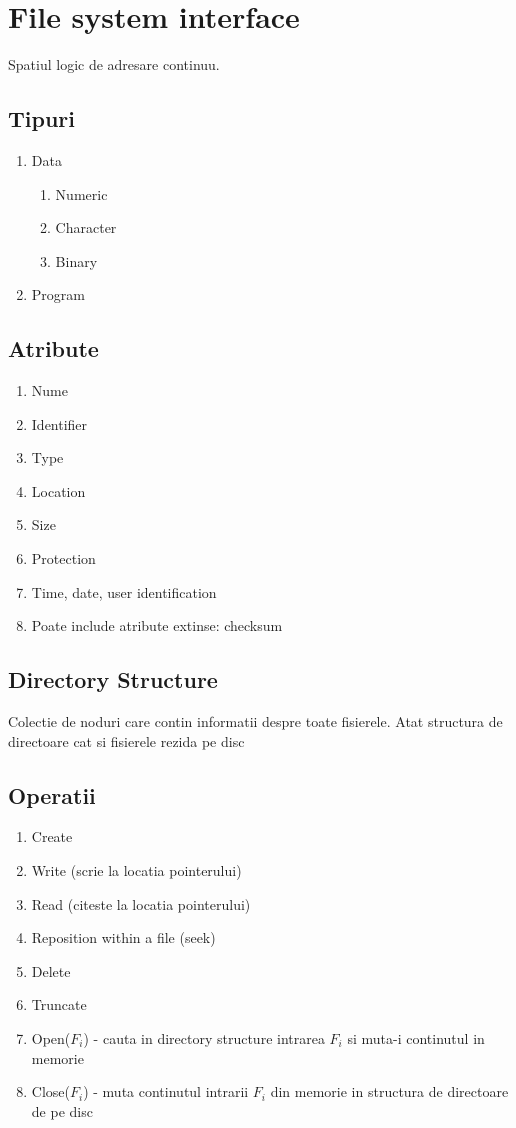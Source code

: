\documentclass{article}
\begin{document}
\section[Ch13 File system interface]{File system interface}
Spatiul logic de adresare continuu.
\subsection*{Tipuri}
\begin{enumerate}
    \item Data
          \begin{enumerate}
              \item Numeric
              \item Character
              \item Binary
          \end{enumerate}
    \item Program
\end{enumerate}

\subsection*{Atribute}
\begin{enumerate}
    \item Nume
    \item Identifier
    \item Type
    \item Location
    \item Size
    \item Protection
    \item Time, date, user identification
    \item Poate include atribute extinse: checksum
\end{enumerate}

\subsection*{Directory Structure}
Colectie de noduri care contin informatii despre toate fisierele. Atat structura de directoare cat si fisierele rezida pe disc

\subsection*{Operatii}
\begin{enumerate}
    \item Create
    \item Write (scrie la locatia pointerului)
    \item Read (citeste la locatia pointerului)
    \item Reposition within a file (seek)
    \item Delete
    \item Truncate
    \item Open($F_i$) - cauta in directory structure intrarea $F_i$ si muta-i continutul in memorie
    \item Close($F_i$) - muta continutul intrarii $F_i$ din memorie in structura de directoare de pe disc
\end{enumerate}
\end{document}
